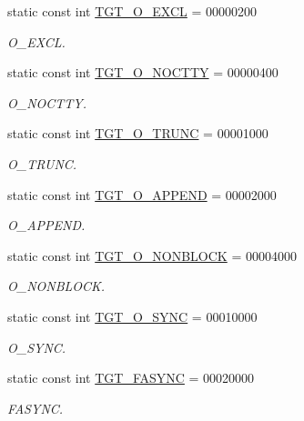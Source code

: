 \begin{DoxyCompactItemize}
static const int \hyperlink{classArmLinux32_a10d5d118d15b51ebdd4b16dc78342d1d}{TGT\_\-O\_\-EXCL} = 00000200
\begin{DoxyCompactList}\small\item\em O\_\-EXCL. \item\end{DoxyCompactList}\item 
static const int \hyperlink{classArmLinux32_adfd4240281579e5f60c5e22c601225d8}{TGT\_\-O\_\-NOCTTY} = 00000400
\begin{DoxyCompactList}\small\item\em O\_\-NOCTTY. \item\end{DoxyCompactList}\item 
static const int \hyperlink{classArmLinux32_a4f892ee6e1424a2becd859b0bef1f18b}{TGT\_\-O\_\-TRUNC} = 00001000
\begin{DoxyCompactList}\small\item\em O\_\-TRUNC. \item\end{DoxyCompactList}\item 
static const int \hyperlink{classArmLinux32_af11adc5404ea3780a5ce2829cc3710b7}{TGT\_\-O\_\-APPEND} = 00002000
\begin{DoxyCompactList}\small\item\em O\_\-APPEND. \item\end{DoxyCompactList}\item 
static const int \hyperlink{classArmLinux32_a0ea5420b4c9b45ba342a266fb77ac942}{TGT\_\-O\_\-NONBLOCK} = 00004000
\begin{DoxyCompactList}\small\item\em O\_\-NONBLOCK. \item\end{DoxyCompactList}\item 
static const int \hyperlink{classArmLinux32_abf43ab05d2a5b6b8113952160d8565db}{TGT\_\-O\_\-SYNC} = 00010000
\begin{DoxyCompactList}\small\item\em O\_\-SYNC. \item\end{DoxyCompactList}\item 
static const int \hyperlink{classArmLinux32_ab23d73086673a1279fc508b68fc47191}{TGT\_\-FASYNC} = 00020000
\begin{DoxyCompactList}\small\item\em FASYNC. \item\end{DoxyCompactList}\item 

\end{DoxyCompactItemize}
